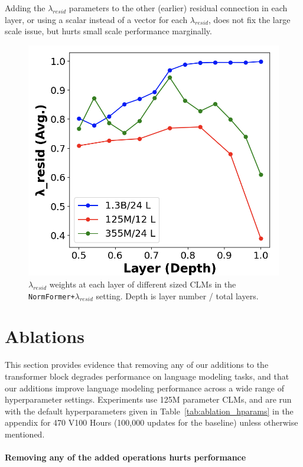 \documentclass{article} %
\begin{document}
Adding the $\lambda_{resid}$ parameters to the other (earlier) residual connection in each layer, or using a scalar instead of a vector for each $\lambda_{resid}$, does not fix the large scale issue, but hurts small scale performance marginally.
\begin{figure}[ht]
\centering
\includegraphics[scale=0.2]{resid_coeff.jpg}
\caption{$\lambda_{resid}$ weights at each layer of different sized CLMs in the \texttt{NormFormer+$\lambda_{resid}$} setting. Depth is layer number / total layers.}
\label{fig:resid-coeff}
\end{figure}

\section{Ablations}
\label{sec:ablations}
This section provides evidence that removing any of our additions to the transformer block degrades performance on language modeling tasks, and that our additions improve language modeling performance across a wide range of hyperparameter settings. Experiments use 125M parameter CLMs, and are run with the default hyperparameters given in Table~\ref{tab:ablation_hparams} in the appendix for 470 V100 Hours (100,000 updates for the baseline) unless otherwise mentioned.

\paragraph{Removing any of the added operations hurts performance}
\end{document}
